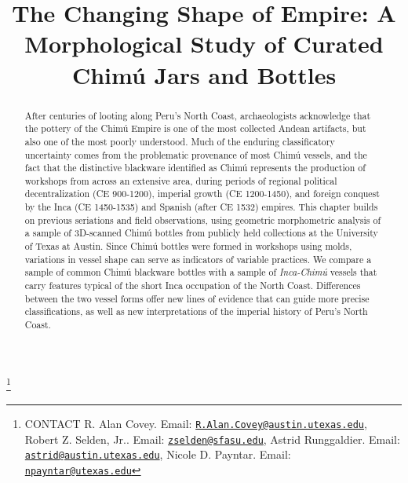 \documentclass[]{interact}
\theoremstyle{plain}%
\theoremstyle{definition}
\theoremstyle{remark}
\begin{document}

\title{The Changing Shape of Empire: A Morphological Study of Curated
Chimú Jars and Bottles}


\author{
}

\thanks{CONTACT R. Alan
Covey. Email: \href{mailto:R.Alan.Covey@austin.utexas.edu}{\nolinkurl{R.Alan.Covey@austin.utexas.edu}}, Robert
Z. Selden,
Jr.. Email: \href{mailto:zselden@sfasu.edu}{\nolinkurl{zselden@sfasu.edu}}, Astrid
Runggaldier. Email: \href{mailto:astrid@austin.utexas.edu}{\nolinkurl{astrid@austin.utexas.edu}}, Nicole
D.
Payntar. Email: \href{mailto:npayntar@utexas.edu}{\nolinkurl{npayntar@utexas.edu}}}

\maketitle

\begin{abstract}
After centuries of looting along Peru's North Coast, archaeologists
acknowledge that the pottery of the Chimú Empire is one of the most
collected Andean artifacts, but also one of the most poorly understood.
Much of the enduring classificatory uncertainty comes from the
problematic provenance of most Chimú vessels, and the fact that the
distinctive blackware identified as Chimú represents the production of
workshops from across an extensive area, during periods of regional
political decentralization (CE 900-1200), imperial growth (CE
1200-1450), and foreign conquest by the Inca (CE 1450-1535) and Spanish
(after CE 1532) empires. This chapter builds on previous seriations and
field observations, using geometric morphometric analysis of a sample of
3D-scanned Chimú bottles from publicly held collections at the
University of Texas at Austin. Since Chimú bottles were formed in
workshops using molds, variations in vessel shape can serve as
indicators of variable practices. We compare a sample of common Chimú
blackware bottles with a sample of \emph{Inca-Chimú} vessels that carry
features typical of the short Inca occupation of the North Coast.
Differences between the two vessel forms offer new lines of evidence
that can guide more precise classifications, as well as new
interpretations of the imperial history of Peru's North Coast.
\end{abstract}
\end{document}
